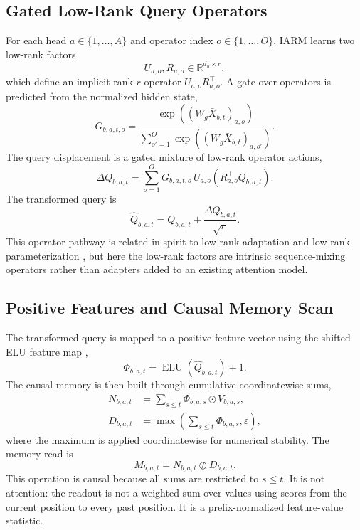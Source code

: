 \documentclass[10pt]{article}
\newcommand{\R}{\mathbb{R}}
\newcommand{\od}{\odot}
\newcommand{\oslashop}{\oslash}
\begin{document}
\subsection{Gated Low-Rank Query Operators}
For each head $a\in\{1,\ldots,A\}$ and operator index $o\in\{1,\ldots,O\}$, IARM learns two low-rank factors
\begin{equation}
U_{a,o},R_{a,o}\in\R^{d_h\times r},
\end{equation}
which define an implicit rank-$r$ operator $U_{a,o}R_{a,o}^{\top}$. A gate over operators is predicted from the normalized hidden state,
\begin{equation}
G_{b,a,t,o}=
\frac{\exp((W_g\bar X_{b,t})_{a,o})}
{\sum_{o'=1}^{O}\exp((W_g\bar X_{b,t})_{a,o'})}.
\end{equation}
The query displacement is a gated mixture of low-rank operator actions,
\begin{equation}
\Delta Q_{b,a,t}
=
\sum_{o=1}^{O}
G_{b,a,t,o}\,U_{a,o}\left(R_{a,o}^{\top}Q_{b,a,t}\right).
\end{equation}
The transformed query is
\begin{equation}
\widehat Q_{b,a,t}=Q_{b,a,t}+\frac{\Delta Q_{b,a,t}}{\sqrt r}.
\end{equation}
This operator pathway is related in spirit to low-rank adaptation and low-rank parameterization \cite{hu2022lora}, but here the low-rank factors are intrinsic sequence-mixing operators rather than adapters added to an existing attention model.

\subsection{Positive Features and Causal Memory Scan}
The transformed query is mapped to a positive feature vector using the shifted ELU feature map \cite{clevert2016fast},
\begin{equation}
\Phi_{b,a,t}=\operatorname{ELU}(\widehat Q_{b,a,t})+1.
\end{equation}
The causal memory is then built through cumulative coordinatewise sums,
\begin{align}
N_{b,a,t} &= \sum_{s\leq t}\Phi_{b,a,s}\od V_{b,a,s}, \\
D_{b,a,t} &= \max\left(\sum_{s\leq t}\Phi_{b,a,s},\varepsilon\right),
\end{align}
where the maximum is applied coordinatewise for numerical stability. The memory read is
\begin{equation}
M_{b,a,t}=N_{b,a,t}\oslashop D_{b,a,t}.
\end{equation}
This operation is causal because all sums are restricted to $s\leq t$. It is not attention: the readout is not a weighted sum over values using scores from the current position to every past position. It is a prefix-normalized feature-value statistic.
\end{document}
